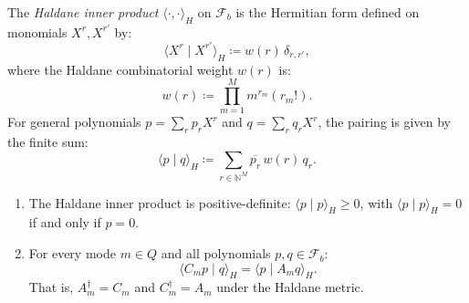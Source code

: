 \begin{definition}
The \emph{Haldane inner product} $\langle \cdot, \cdot \rangle_H$ on $\mathcal{F}_b$ is the Hermitian form defined on monomials $X^r, X^{r'}$ by:
\begin{equation}
\langle X^r \mid X^{r'} \rangle_H \coloneqq w(r)\, \delta_{r, r'},
\end{equation}
where the Haldane combinatorial weight $w(r)$ is:
\begin{equation}
w(r) \coloneqq \prod_{m=1}^M m^{r_m} (r_m!).
\end{equation}
For general polynomials $p = \sum_r p_r X^r$ and $q = \sum_r q_r X^r$, the pairing is given by the finite sum:
\begin{equation}
\langle p \mid q \rangle_H \coloneqq \sum_{r \in \mathbb{N}^M} \overline{p_r}\, w(r)\, q_r.
\end{equation}
\end{definition}

\begin{proposition}
\label{prop:haldane_adjoint}
\begin{enumerate}
    \item The Haldane inner product is positive-definite: $\langle p \mid p \rangle_H \ge 0$, with $\langle p \mid p \rangle_H = 0$ if and only if $p = 0$.
    \item For every mode $m \in Q$ and all polynomials $p, q \in \mathcal{F}_b$:
    \begin{equation}
    \langle C_m p \mid q \rangle_H = \langle p \mid A_m q \rangle_H.
    \end{equation}
    That is, $A_m^\dagger = C_m$ and $C_m^\dagger = A_m$ under the Haldane metric.
\end{enumerate}
\end{proposition}

